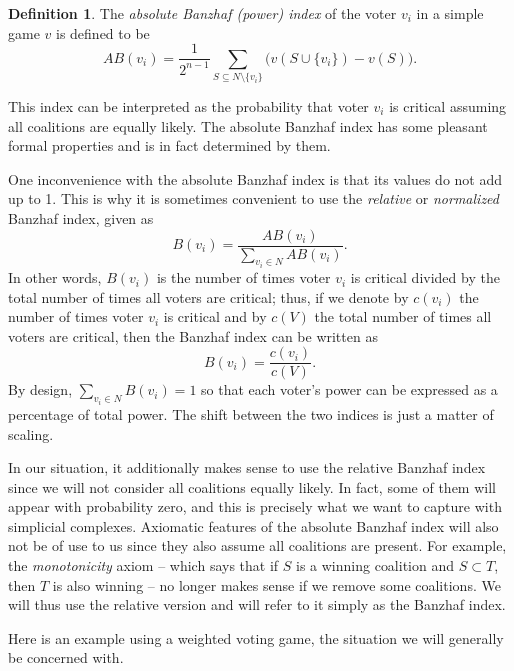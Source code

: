 \documentclass[11pt]{amsart}
\theoremstyle{plain}
\theoremstyle{definition}
\newtheorem{defin}[thm]{Definition}
\theoremstyle{remark}
\begin{document}
\begin{defin}\label{D:BanzhafIndex}
The \emph{absolute Banzhaf (power) index} of the voter $v_i$ in a simple game $v$ is defined to be 
\begin{equation}\label{E:AbsoluteBanzhaf}
AB(v_i)=\frac{1}{2^{n-1}}\sum_{S\subseteq N\setminus\{v_i\}} \big(v(S\cup \{v_i\}) - v(S)  \big).
\end{equation}
\end{defin}
This index can be interpreted as the probability that voter $v_i$ is critical assuming all coalitions are equally likely. The absolute Banzhaf index has some pleasant formal properties and is in fact determined by them.

One inconvenience with the absolute Banzhaf index is that its values do not add up to 1. This is why it is sometimes convenient to use the \emph{relative} or \emph{normalized} Banzhaf index, given as
\begin{equation}\label{E:RelativeBanzhaf}
B(v_i)=\frac{AB(v_i)}{\sum_{v_i\in N}AB(v_i)}.
\end{equation}
In other words, $B(v_i)$ is the number of times voter $v_i$ is critical divided by the total number of times all voters are critical; thus, if we denote by $c(v_i)$ the number of times voter $v_i$ is critical and by $c(V)$ the total number of times all voters are critical, then the Banzhaf index can be written as $$B(v_i)=\frac{c(v_i)}{c(V)}.$$
By design, $\sum_{v_i\in N}B(v_i)=1$ so that each voter's power can be expressed as a percentage of total power. The shift between the two indices is just a matter of scaling. 

In our situation, it additionally makes sense to use the relative Banzhaf index since we will not consider all coalitions equally likely. In fact, some of them will appear with probability zero, and this is precisely what we want to capture with simplicial complexes. Axiomatic features of the absolute Banzhaf index will also not be of use to us since they also assume all coalitions are present. For example, the \emph{monotonicity} axiom -- which says that if $S$ is a winning coalition and  $S\subset T$, then $T$ is also winning -- no longer makes sense if we remove some coalitions. We will thus use the relative version and will refer to it simply as the Banzhaf index.  


Here is an example using a weighted voting game, the situation we will generally be concerned with.
\end{document}
